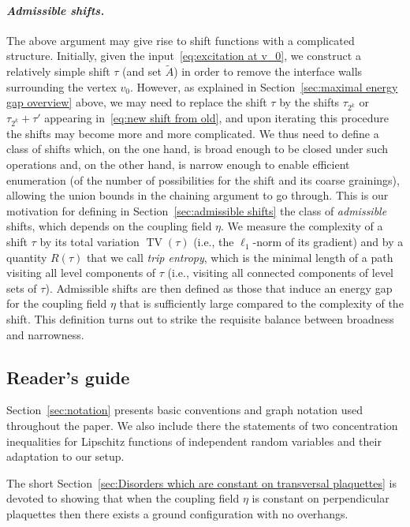 \documentclass[11pt, reqno]{amsart}
\DeclareMathOperator{\TV}{TV}
\numberwithin{equation}{section}
\begin{document}
\smallskip
\paragraph{\emph{Admissible shifts.}}\label{sec:admissible shifts overview} The above argument may give rise to shift functions with a complicated structure. Initially, given the input~\eqref{eq:excitation at v_0}, we construct a relatively simple shift $\tau$ (and set $\tilde{A}$) in order to remove the interface walls surrounding the vertex $v_0$. However, as explained in Section~\ref{sec:maximal energy gap overview} above, we may need to replace the shift $\tau$ by the shifts $\tau_{2^k}$ or $\tau_{2^k}+\tau'$ appearing in~\eqref{eq:new shift from old}, and upon iterating this procedure the shifts may become more and more complicated.
We thus need to define a class of shifts which, on the one hand, is broad enough to be closed under such operations and, on the other hand, is narrow enough to enable efficient enumeration (of the number of possibilities for the shift and its coarse grainings), allowing the union bounds in the chaining argument to go through. This is our motivation for defining in Section~\ref{sec:admissible shifts} the class of \emph{admissible} shifts, which depends on the coupling field $\eta$. We measure the complexity of a shift $\tau$ by its total variation $\TV(\tau)$ (i.e., the $\ell_1$-norm of its gradient) and by a quantity $R(\tau)$ that we call \emph{trip entropy}, which is the minimal length of a path visiting all level components of $\tau$ (i.e., visiting all connected components of level sets of $\tau$).
Admissible shifts are then defined as those that induce an energy gap for the coupling field $\eta$ that is sufficiently large compared to the complexity of the shift. This definition turns out to strike the requisite balance between broadness and narrowness.

\subsection{Reader's guide}\label{sec:readers guide}

Section~\ref{sec:notation} presents basic conventions and graph notation used throughout the paper. We also include there the statements of two concentration inequalities for Lipschitz functions of independent random variables and their adaptation to our setup. 

The short Section~\ref{sec:Disorders which are constant on transversal plaquettes} is devoted to showing that when the coupling field $\eta$ is constant on perpendicular plaquettes then there exists a ground configuration with no overhangs. 
\end{document}
